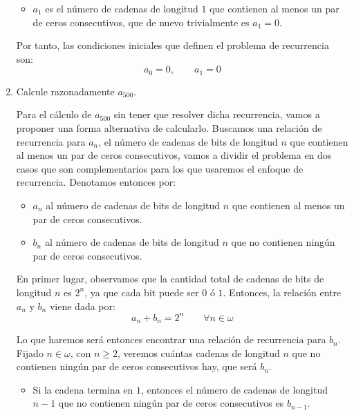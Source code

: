 \documentclass[12pt]{article}
\begin{document}
\begin{ejercicio}
\begin{enumerate}
\begin{itemize}
                \item $a_1$ es el número de cadenas de longitud $1$ que contienen al menos un par de ceros consecutivos,
                que de nuevo trivialmente es $a_1=0$.
            \end{itemize}

            Por tanto, las condiciones iniciales que definen el problema de recurrencia son:
            \begin{equation*}
                a_0 = 0, \qquad a_1 = 0
            \end{equation*}            

            
            \item Calcule razonadamente $a_{500}$.
            
            Para el cálculo de $a_{500}$ sin tener que resolver dicha recurrencia, vamos a proponer una forma alternativa de calcularlo.
            Buscamos una relación de recurrencia para $a_n$, el número de cadenas de bits de longitud $n$ que contienen al menos un par de ceros consecutivos,
            vamos a dividir el problema en dos casos que son complementarios para los que usaremos el enfoque de recurrencia.
            Denotamos entonces por:
            \begin{itemize}
                \item $a_n$ al número de cadenas de bits de longitud $n$ que contienen al menos un par de ceros consecutivos.
                \item $b_n$ al número de cadenas de bits de longitud $n$ que no contienen ningún par de ceros consecutivos.
            \end{itemize}

            En primer lugar, observamos que la cantidad total de cadenas de bits de longitud $n$ es $2^n$, ya que cada bit puede ser $0$ ó $1$. Entonces,
            la relación entre $a_n$ y $b_n$ viene dada por:
            \begin{equation*}
                a_n + b_n = 2^n \qquad \forall n\in \omega
            \end{equation*}
            
            Lo que haremos será entonces encontrar una relación de recurrencia para $b_n$.
            Fijado $n\in \omega$, con $n\geq 2$, veremos cuántas cadenas de longitud $n$ que no contienen ningún par de ceros consecutivos hay, que será $b_n$.
            \begin{itemize}
                \item Si la cadena termina en $1$, entonces el número de cadenas de longitud $n-1$ que no contienen ningún par de ceros consecutivos
                es $b_{n-1}$.
                

\end{itemize}
\end{enumerate}
\end{ejercicio}
\end{document}
